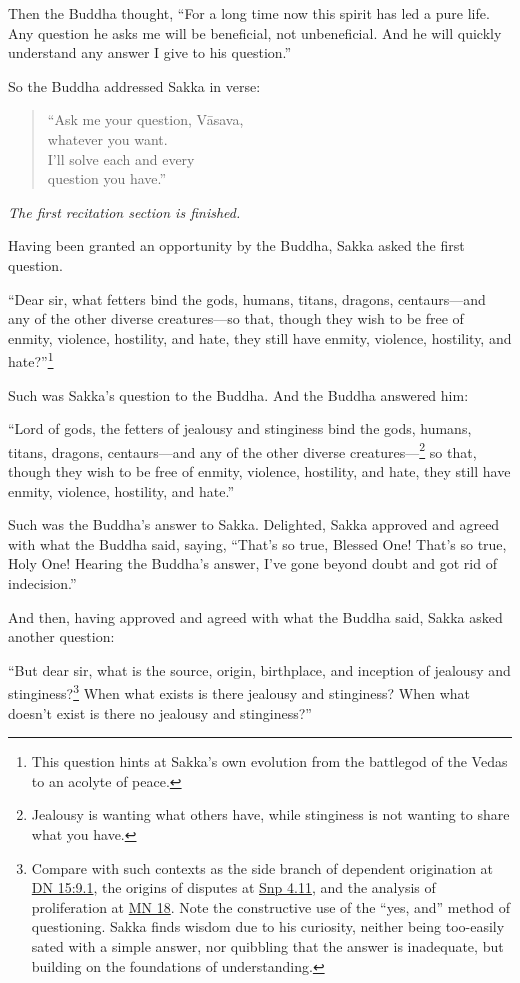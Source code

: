 \documentclass[12pt,openany]{book}%
\newcommand*{\scendsection}[1]{\begin{Center}\begin{small}\textit{#1}\end{small}\end{Center}\addvspace{1em}}
\begin{document}
Then the Buddha thought, “For a long time now this spirit has led a pure life. Any question he asks me will be beneficial, not unbeneficial. And he will quickly understand any answer I give to his question.” 

So the Buddha addressed Sakka in verse: 

\begin{verse}%
“Ask me your question, \textsanskrit{Vāsava}, \\
whatever you want. \\
I’ll solve each and every \\
question you have.” 

%
\end{verse}

\scendsection{The first recitation section is finished. }

Having been granted an opportunity by the Buddha, Sakka asked the first question. 

“Dear sir, what fetters bind the gods, humans, titans, dragons, centaurs—and any of the other diverse creatures—so that, though they wish to be free of enmity, violence, hostility, and hate, they still have enmity, violence, hostility, and hate?”\footnote{This question hints at Sakka’s own evolution from the battlegod of the Vedas to an acolyte of peace. } 

Such was Sakka’s question to the Buddha. And the Buddha answered him: 

“Lord of gods, the fetters of jealousy and stinginess bind the gods, humans, titans, dragons, centaurs—and any of the other diverse creatures—\footnote{Jealousy is wanting what others have, while stinginess is not wanting to share what you have. } so that, though they wish to be free of enmity, violence, hostility, and hate, they still have enmity, violence, hostility, and hate.” 

Such was the Buddha’s answer to Sakka. Delighted, Sakka approved and agreed with what the Buddha said, saying, “That’s so true, Blessed One! That’s so true, Holy One! Hearing the Buddha’s answer, I’ve gone beyond doubt and got rid of indecision.” 

And then, having approved and agreed with what the Buddha said, Sakka asked another question: 

“But dear sir, what is the source, origin, birthplace, and inception of jealousy and stinginess?\footnote{Compare with such contexts as the side branch of dependent origination at \href{https://suttacentral.net/dn15/en/sujato\#9.1}{DN 15:9.1}, the origins of disputes at \href{https://suttacentral.net/snp4.11/en/sujato}{Snp 4.11}, and the analysis of proliferation at \href{https://suttacentral.net/mn18/en/sujato}{MN 18}. Note the constructive use of the “yes, and” method of questioning. Sakka finds wisdom due to his curiosity, neither being too-easily sated with a simple answer, nor quibbling that the answer is inadequate, but building on the foundations of understanding. } When what exists is there jealousy and stinginess? When what doesn’t exist is there no jealousy and stinginess?” 
\end{document}
